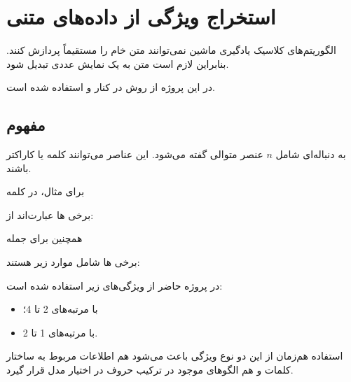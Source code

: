 \section{استخراج ویژگی از داده‌های متنی}

الگوریتم‌های کلاسیک یادگیری ماشین نمی‌توانند متن خام را مستقیماً پردازش کنند. بنابراین لازم است متن به یک نمایش عددی تبدیل شود.

در این پروژه از روش
در کنار
و
استفاده شده است.


\subsection{مفهوم }

به دنباله‌ای شامل $n$ عنصر متوالی گفته می‌شود. این عناصر می‌توانند کلمه یا کاراکتر باشند.

برای مثال، در کلمه

\begin{center}
\end{center}

برخی
ها عبارت‌اند از:

\begin{center}
\end{center}

همچنین برای جمله

\begin{center}
\end{center}

برخی
ها شامل موارد زیر هستند:

\begin{center}
\end{center}

در پروژه حاضر از ویژگی‌های زیر استفاده شده است:

\begin{itemize}
	\item {} با مرتبه‌های 2 تا 4؛
	\item {} با مرتبه‌های 1 تا 2.
\end{itemize}

استفاده هم‌زمان از این دو نوع ویژگی باعث می‌شود هم اطلاعات مربوط به ساختار کلمات و هم الگوهای موجود در ترکیب حروف در اختیار مدل قرار گیرد.


